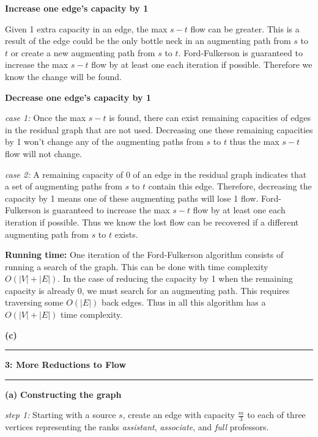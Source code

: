 \documentclass[11pt]{article}
\newcommand\question[2]{\vspace{.25in}\hrule\textbf{#1: #2}\vspace{.5em}\hrule\vspace{.10in}}
\renewcommand\part[1]{\vspace{.10in}\textbf{(#1)}}
\newcommand\runtime{\vspace{.10in}\textbf{Running time: }}
\begin{document}
\textbf{Increase one edge's capacity by 1}

Given 1 extra capacity in an edge, the max $s-t$ flow can be greater. This is a result of the edge could be the only bottle neck in an augmenting path from $s$ to $t$ or create a new augmenting path from $s$ to $t$. Ford-Fulkerson is guaranteed to increase the max $s-t$ flow by at least one each iteration if possible. Therefore we know the change will be found.

\textbf{Decrease one edge's capacity by 1}

\textit{case 1:} Once the max $s-t$ is found, there can exist remaining capacities of edges in the residual graph that are not used. Decreasing one these remaining capacities by 1 won't change any of the augmenting paths from $s$ to $t$ thus the max $s-t$ flow will not change.

\textit{case 2:} A remaining capacity of 0 of an edge in the residual graph indicates that a set of augmenting paths from $s$ to $t$ contain this edge. Therefore, decreasing the capacity by 1 means one of these augmenting paths will lose 1 flow. Ford-Fulkerson is guaranteed to increase the max $s-t$ flow by at least one each iteration if possible. Thus we know the lost flow can be recovered if a different augmenting path from $s$ to $t$ exists.

\runtime One iteration of the Ford-Fulkerson algorithm consists of running a search of the graph. This can be done with time complexity $O(|V| + |E|)$. In the case of reducing the capacity by 1 when the remaining capacity is already 0, we must search for an augmenting path. This requires traversing some $O(|E|)$ back edges. Thus in all this algorithm has a $O(|V| + |E|)$ time complexity.


\part{c}

\question{3}{More Reductions to Flow}

\part{a} \textbf{Constructing the graph} 

\textit{step 1:} Starting with a source $s$, create an edge with capacity $\frac{m}{3}$ to each of three vertices representing the ranks \textit{assistant}, \textit{associate}, and \textit{full} professors. 
\end{document}
